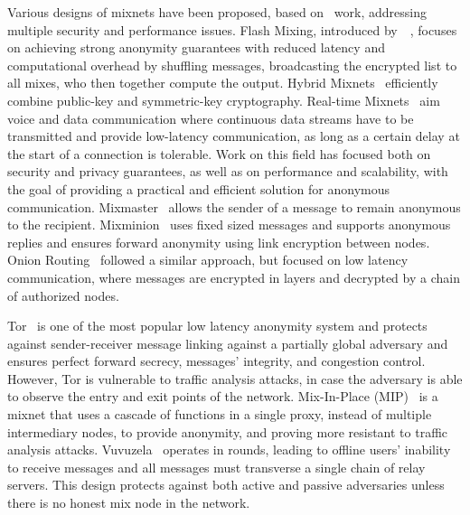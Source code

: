 Various designs of mixnets have been proposed, based on~\citeauthor{Chaum2003} work, addressing multiple security and performance issues. Flash Mixing, introduced by~\citeauthor{FlashMixing}~\cite{FlashMixing}, focuses on achieving strong anonymity guarantees with reduced latency and computational overhead by shuffling messages, broadcasting the encrypted list to all mixes, who then together compute the output. Hybrid Mixnets~\cite*{HybridMixJakobsson, HybridMixMiyako} efficiently combine public-key and symmetric-key cryptography. Real-time Mixnets~\cite{RealTimeMix} aim voice and data communication where continuous data streams have to be transmitted and provide low-latency communication, as long as a certain delay at the start of a connection is tolerable.
Work on this field has focused both on security and privacy guarantees, as well as on performance and scalability, with the goal of providing a practical and efficient solution for anonymous communication. Mixmaster~\cite{Mixmaster} allows the sender of a message to remain anonymous to the recipient. Mixminion~\cite{Mixminion} uses fixed sized messages and supports anonymous replies and ensures forward anonymity using link encryption between nodes.
Onion Routing~\cite{OnionRouting} followed a similar approach, but focused on low latency communication, where messages are encrypted in layers and decrypted by a chain of authorized nodes. 

Tor~\cite{dingledine2004tor} is one of the most popular low latency anonymity system and protects against sender-receiver message linking against a partially global adversary and ensures perfect forward secrecy, messages' integrity, and congestion control. However, Tor is vulnerable to traffic analysis attacks, in case the adversary is able to observe the entry and exit points of the network.
Mix-In-Place (MIP)~\cite{MixInPlace} is a mixnet that uses a cascade of functions in a single proxy, instead of multiple intermediary nodes, to provide anonymity, and proving more resistant to traffic analysis attacks. 
Vuvuzela~\cite{Vuvuzela} operates in rounds, leading to offline users' inability to receive messages and all messages must transverse a single chain of relay servers. This design protects against both active and passive adversaries unless there is no honest mix node in the network.

